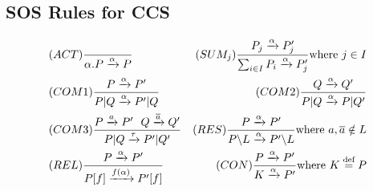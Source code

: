 \subsection*{SOS Rules for CCS}
\begin{align*}
&(ACT)\dfrac{}{\alpha.P\xrightarrow{\alpha}P}
&(SUM_j)\dfrac{P_j\xrightarrow{\alpha}P_j'}{\sum_{i\in I}P_i\xrightarrow{\alpha}P_j'}\text{where } j\in I\\
&(COM1)\dfrac{P\xrightarrow{\alpha}P'}{P\vert Q\xrightarrow{\alpha}P'\vert Q}
&(COM2)\dfrac{Q\xrightarrow{\alpha}Q'}{P\vert Q\xrightarrow{\alpha}P\vert Q'}\\
&(COM3)\dfrac{P\xrightarrow{a}P'~~Q\xrightarrow{\overline{a}}Q'}{P\vert Q\xrightarrow{\tau}P'\vert Q'}
&(RES)\dfrac{P\xrightarrow{\alpha}P'}{P\backslash L\xrightarrow{\alpha}P'\backslash L}\text{where } a,\overline{a}\notin L\\
&(REL)\dfrac{P\xrightarrow{\alpha}P'}{P[f]\xrightarrow{f(\alpha)}P'[f]}
&(CON)\dfrac{P\xrightarrow{\alpha}P'}{K\xrightarrow{\alpha}P'}\text{where }K\definedby P
\end{align*}